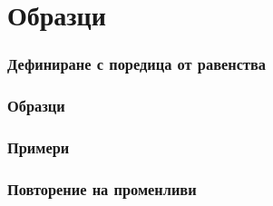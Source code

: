 \documentclass{beamer}
\begin{document}
\section{Образци}

\begin{frame}
  \frametitle{Дефиниране с поредица от равенства}
  
\end{frame}

\begin{frame}
  \frametitle{Образци}
  
\end{frame}

\begin{frame}
  \frametitle{Примери}
  
\end{frame}

\begin{frame}
  \frametitle{Повторение на променливи}
  
\end{frame}
\end{document}
